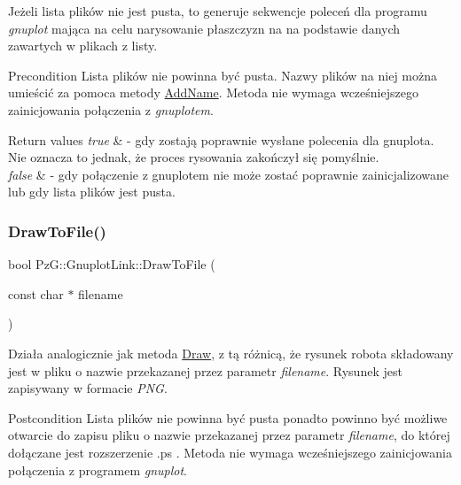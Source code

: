 Jeżeli lista plików nie jest pusta, to generuje sekwencje poleceń dla programu {\itshape gnuplot} mająca na celu narysowanie płaszczyzn na na podstawie danych zawartych w plikach z listy.

\begin{DoxyPrecond}{Precondition}
Lista plików nie powinna być pusta. Nazwy plików na niej można umieścić za pomoca metody \hyperlink{}{Add\+Name}. Metoda nie wymaga wcześniejszego zainicjowania połączenia z {\itshape gnuplotem}. 
\end{DoxyPrecond}

\begin{DoxyRetVals}{Return values}
{\em true} & -\/ gdy zostają poprawnie wysłane polecenia dla gnuplota. Nie oznacza to jednak, że proces rysowania zakończył się pomyślnie. \\
\hline
{\em false} & -\/ gdy połączenie z gnuplotem nie może zostać poprawnie zainicjalizowane lub gdy lista plików jest pusta. \\
\hline
\end{DoxyRetVals}
\mbox{\label{class_pz_g_1_1_gnuplot_link_a77b3776f569733b570681190b12d1891}} 
\subsubsection{\texorpdfstring{Draw\+To\+File()}{DrawToFile()}}
{\footnotesize\ttfamily bool Pz\+G\+::\+Gnuplot\+Link\+::\+Draw\+To\+File (\begin{DoxyParamCaption}\item[{const char $\ast$}]{filename }\end{DoxyParamCaption})}

Działa analogicznie jak metoda \hyperlink{class_pz_g_1_1_gnuplot_link_a96321ba10f7ee9c5f55dd17a28143a39}{Draw}, z tą różnicą, że rysunek robota składowany jest w pliku o nazwie przekazanej przez parametr {\itshape filename}. Rysunek jest zapisywany w formacie {\itshape P\+NG}.

\begin{DoxyPostcond}{Postcondition}
Lista plików nie powinna być pusta ponadto powinno być możliwe otwarcie do zapisu pliku o nazwie przekazanej przez parametr {\itshape filename}, do której dołączane jest rozszerzenie .ps . Metoda nie wymaga wcześniejszego zainicjowania połączenia z programem {\itshape gnuplot}.
\end{DoxyPostcond}

